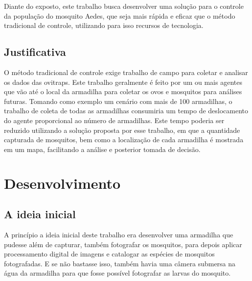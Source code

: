\documentclass[
	12pt,				%
	openright,			%
	oneside,			%
	a4paper,			%
	chapter=TITLE,		%
	english,			%
	brazil				%
	]{abntex2}
\begin{document}
Diante do exposto, este trabalho busca desenvolver uma solução para o controle da
população do mosquito Aedes, que seja mais rápida e eficaz que o método tradicional de
controle, utilizando para isso recursos de tecnologia.

\section{Justificativa}

O método tradicional de controle exige trabalho de campo para coletar e analisar os dados
das ovitraps. Este trabalho geralmente é feito por um ou mais agentes que vão até o local
da armadilha para coletar os ovos e mosquitos para análises futuras. Tomando como
exemplo um cenário com mais de 100 armadilhas, o trabalho de coleta de todas as
armadilhas consumiria um tempo de deslocamento do agente proporcional ao número de
armadilhas. Este tempo poderia ser reduzido utilizando a solução proposta por esse trabalho, em que a quantidade capturada de mosquitos,
bem como a localização de cada armadilha é mostrada em um mapa, facilitando a análise e posterior tomada de decisão.

\chapter{Desenvolvimento}

\section{A ideia inicial}

A princípio a ideia inicial deste trabalho era desenvolver uma armadilha que pudesse além de capturar, também fotografar os mosquitos, para depois aplicar processamento digital de 
imagens e catalogar as espécies de mosquitos fotografadas. E se não bastasse isso, também havia uma câmera submersa na água da armadilha para que fosse possível 
fotografar as larvas do mosquito.
\end{document}
